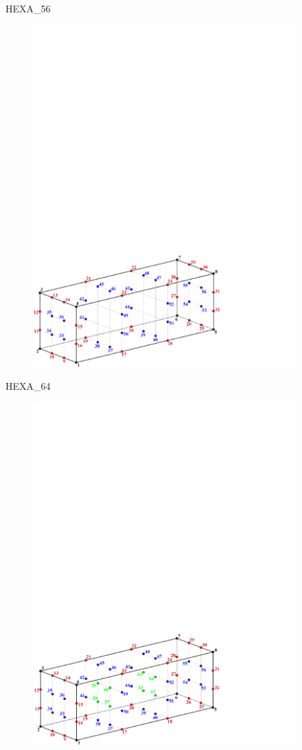 {{{\bigskip

HEXA\_56
\begin{figure}[!htb]
   \includegraphics[width=4in]{conv.figs/TecplotFiles_Cubic_Element/All_Figures/hex_56}
\end{figure}

\newpage
HEXA\_64
\begin{figure}[!htb]
   \includegraphics[width=4in]{conv.figs/TecplotFiles_Cubic_Element/All_Figures/hex_64}
\end{figure}

}}}
